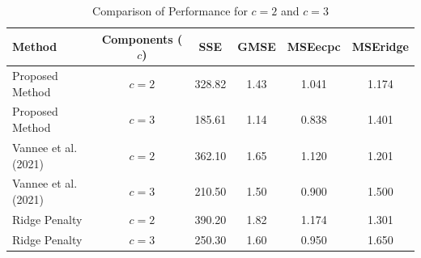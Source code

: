\begin{table}[h!]
	\centering
	\caption{Comparison of Performance for \(c=2\) and \(c=3\)}
	\label{table4}
	\begin{tabular}{|l|c|c|c|c|c|}
		\hline
		\textbf{Method}            & \textbf{Components (\(c\))} & \textbf{SSE} & \textbf{GMSE} & \textbf{MSEecpc} & \textbf{MSEridge} \\ \hline
		Proposed Method            & \(c=2\)                   & 328.82       & 1.43          & 1.041            & 1.174             \\ \hline
		Proposed Method            & \(c=3\)                   & 185.61       & 1.14          & 0.838            & 1.401             \\ \hline
		Vannee et al. (2021)       & \(c=2\)                   & 362.10       & 1.65          & 1.120            & 1.201             \\ \hline
		Vannee et al. (2021)       & \(c=3\)                   & 210.50       & 1.50          & 0.900            & 1.500             \\ \hline
		Ridge Penalty              & \(c=2\)                   & 390.20       & 1.82          & 1.174            & 1.301             \\ \hline
		Ridge Penalty              & \(c=3\)                   & 250.30       & 1.60          & 0.950            & 1.650             \\ \hline
	\end{tabular}
\end{table}

%
%
